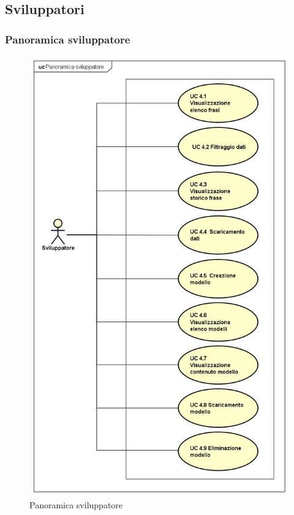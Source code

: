 \subsection{Sviluppatori}
\subsubsection{Panoramica sviluppatore}
\begin{figure}[H]
\centering
\includegraphics[width=17cm, height = 19cm]{img/UC4x.png} 
\caption{Panoramica sviluppatore}\label{fig:4x}
\end{figure}
